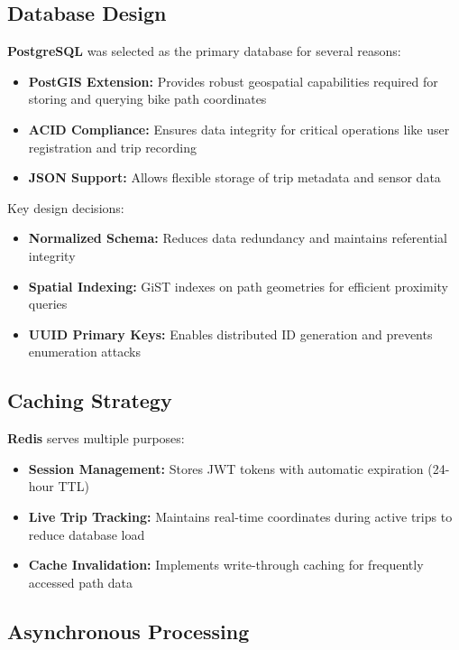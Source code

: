 \subsection{Database Design}
\label{subsec:database_design}

\textbf{PostgreSQL} was selected as the primary database for several reasons:
\begin{itemize}
    \item \textbf{PostGIS Extension:} Provides robust geospatial capabilities required for storing and querying bike path coordinates
    \item \textbf{ACID Compliance:} Ensures data integrity for critical operations like user registration and trip recording
    \item \textbf{JSON Support:} Allows flexible storage of trip metadata and sensor data
\end{itemize}

Key design decisions:
\begin{itemize}
    \item \textbf{Normalized Schema:} Reduces data redundancy and maintains referential integrity
    \item \textbf{Spatial Indexing:} GiST indexes on path geometries for efficient proximity queries
    \item \textbf{UUID Primary Keys:} Enables distributed ID generation and prevents enumeration attacks
\end{itemize}

\subsection{Caching Strategy}
\label{subsec:caching_strategy}

\textbf{Redis} serves multiple purposes:
\begin{itemize}
    \item \textbf{Session Management:} Stores JWT tokens with automatic expiration (24-hour TTL)
    \item \textbf{Live Trip Tracking:} Maintains real-time coordinates during active trips to reduce database load
    \item \textbf{Cache Invalidation:} Implements write-through caching for frequently accessed path data
\end{itemize}

\subsection{Asynchronous Processing}
\label{subsec:async_processing}

